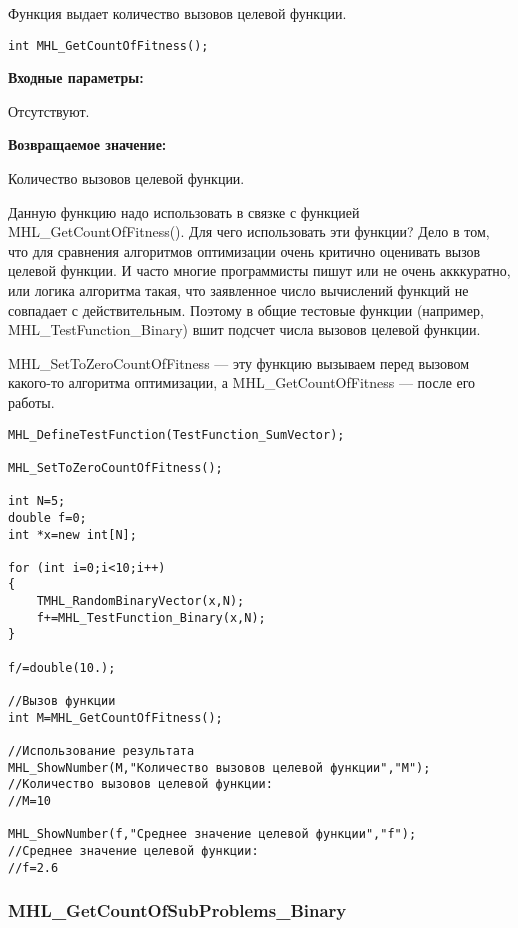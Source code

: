 \documentclass[a4paper,12pt]{article}
\begin{document}
Функция выдает количество вызовов целевой функции.


\begin{lstlisting}[label=code_syntax_MHL_GetCountOfFitness,caption=Синтаксис]
int MHL_GetCountOfFitness();
\end{lstlisting}

\textbf{Входные параметры:}

Отсутствуют.

\textbf{Возвращаемое значение:}
 
Количество вызовов целевой функции.

Данную функцию надо использовать в связке с функцией MHL\_GetCountOfFitness(). Для чего использовать эти функции? Дело в том, что для сравнения алгоритмов оптимизации очень критично оценивать вызов целевой функции. И часто многие программисты пишут или не очень акккуратно, или логика алгоритма такая, что заявленное число вычислений функций не совпадает с действительным. Поэтому в общие тестовые функции (например, MHL\_TestFunction\_Binary) вшит подсчет числа вызовов целевой функции.

MHL\_SetToZeroCountOfFitness --- эту функцию вызываем перед вызовом какого-то алгоритма оптимизации, а MHL\_GetCountOfFitness --- после его работы.


\begin{lstlisting}[label=code_use_MHL_GetCountOfFitness,caption=Пример использования]
MHL_DefineTestFunction(TestFunction_SumVector);

MHL_SetToZeroCountOfFitness();

int N=5;
double f=0;
int *x=new int[N];

for (int i=0;i<10;i++)
{
    TMHL_RandomBinaryVector(x,N);
    f+=MHL_TestFunction_Binary(x,N);
}

f/=double(10.);

//Вызов функции
int M=MHL_GetCountOfFitness();

//Использование результата
MHL_ShowNumber(M,"Количество вызовов целевой функции","M");
//Количество вызовов целевой функции:
//M=10

MHL_ShowNumber(f,"Среднее значение целевой функции","f");
//Среднее значение целевой функции:
//f=2.6
\end{lstlisting}

\subsubsection{MHL\_GetCountOfSubProblems\_Binary}\label{MHL_GetCountOfSubProblems_Binary}
\end{document}
